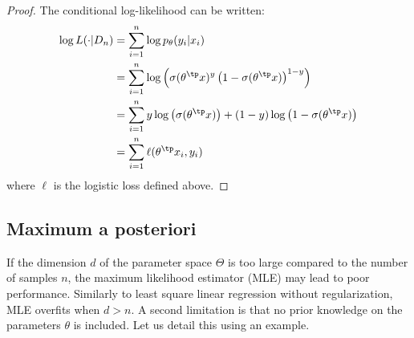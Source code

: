 \documentclass[toc, titlepaged]{../cs-classes/cs-classes}
\begin{document}
\begin{proof}
    The conditional log-likelihood can be written:
    \begin{equation*}
        \begin{aligned}
            \log L(\cdot|D_n) &= \sum_{i=1}^n \log p_\theta(y_i|x_i)\\
            &= \sum_{i=1}^n \log\left(\sigma(\theta^\tp x)^y\left(1-\sigma(\theta^\tp x)\right)^{1-y}\right)\\
            &= \sum_{i=1}^n y\log\left(\sigma(\theta^\tp x)\right) + (1-y)\log\left(1-\sigma(\theta^\tp x)\right)\\
            &= \sum_{i=1}^n \ell(\theta^\tp x_i, y_i)
        \end{aligned}
    \end{equation*}
    where $\ell$ is the logistic loss defined above.
\end{proof}

\subsection{Maximum a posteriori}
If the dimension $d$ of the parameter space $\Theta$ is too large compared to the number of samples $n$, the maximum likelihood estimator (MLE) may lead to poor performance. Similarly to least square linear regression without regularization, MLE overfits when $d>n$. A second limitation is that no prior knowledge on the parameters $\theta$ is included. Let us detail this using an example.
\end{document}
